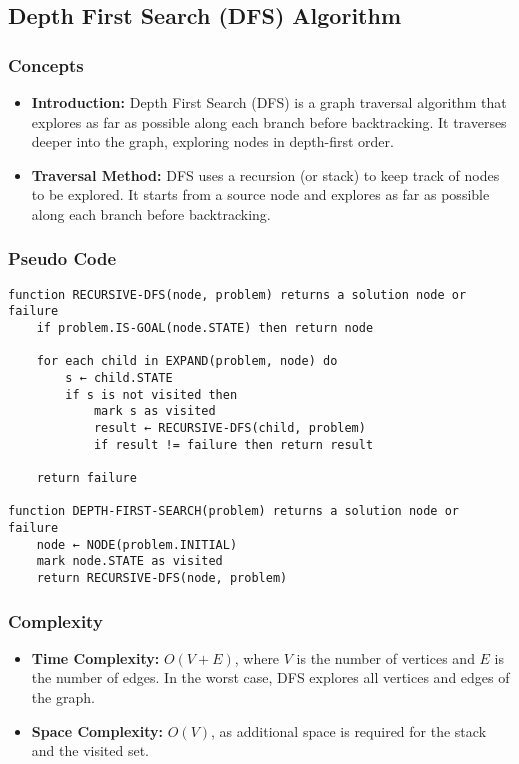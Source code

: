 \subsection{Depth First Search (DFS) Algorithm }
\subsubsection*{Concepts}
\begin{itemize}
    \item \textbf{Introduction:} Depth First Search (DFS) is a graph traversal algorithm that explores as far as possible along each branch before backtracking. It traverses deeper into the graph, exploring nodes in depth-first order.
    \item \textbf{Traversal Method:} DFS uses a recursion (or stack) to keep track of nodes to be explored. It starts from a source node and explores as far as possible along each branch before backtracking.
\end{itemize}

\subsubsection*{Pseudo Code}
\begin{verbatim}
function RECURSIVE-DFS(node, problem) returns a solution node or failure
    if problem.IS-GOAL(node.STATE) then return node
    
    for each child in EXPAND(problem, node) do
        s ← child.STATE
        if s is not visited then
            mark s as visited
            result ← RECURSIVE-DFS(child, problem)
            if result != failure then return result
    
    return failure
           
function DEPTH-FIRST-SEARCH(problem) returns a solution node or failure
    node ← NODE(problem.INITIAL)
    mark node.STATE as visited
    return RECURSIVE-DFS(node, problem)
\end{verbatim}

\subsubsection*{Complexity}
\begin{itemize}
    \item \textbf{Time Complexity:} \(O(V + E)\), where \(V\) is the number of vertices and \(E\) is the number of edges. In the worst case, DFS explores all vertices and edges of the graph.
    \item \textbf{Space Complexity:} \(O(V)\), as additional space is required for the stack and the visited set.
\end{itemize}

